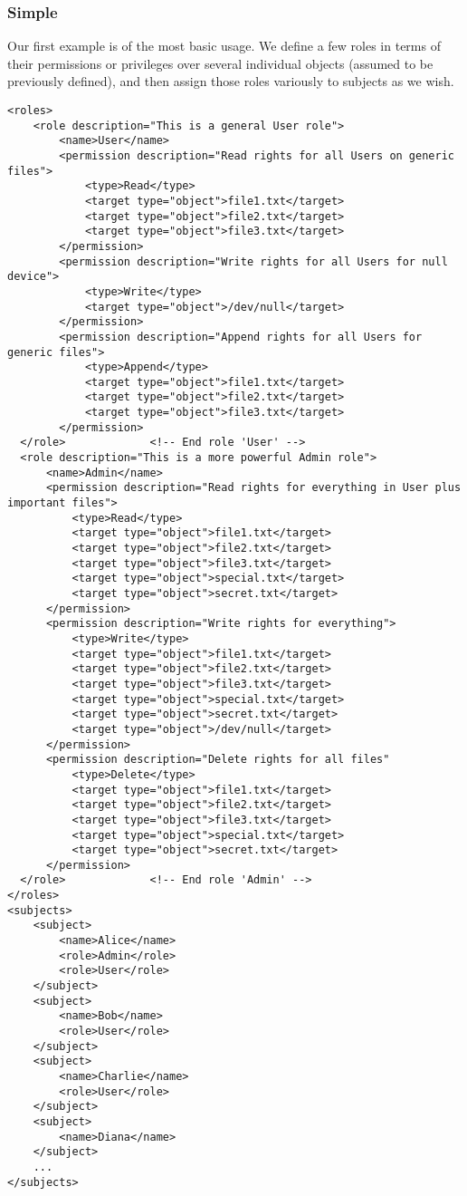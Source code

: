 \documentclass{article}
\begin{document}
\subsubsection{Simple}
Our first example is of the most basic usage. We define a few roles in terms of their permissions or privileges over several individual objects (assumed to be previously defined), and then assign those roles variously to subjects as we wish.
\begin{lstlisting}
<roles>
    <role description="This is a general User role">
        <name>User</name>
        <permission description="Read rights for all Users on generic files">
            <type>Read</type>
            <target type="object">file1.txt</target>
            <target type="object">file2.txt</target>
            <target type="object">file3.txt</target>
        </permission>
        <permission description="Write rights for all Users for null device">
            <type>Write</type>
            <target type="object">/dev/null</target>
        </permission>
        <permission description="Append rights for all Users for generic files">
            <type>Append</type>
            <target type="object">file1.txt</target>
            <target type="object">file2.txt</target>
            <target type="object">file3.txt</target>
        </permission>
  </role>             <!-- End role 'User' -->
  <role description="This is a more powerful Admin role">
      <name>Admin</name>
      <permission description="Read rights for everything in User plus important files">
          <type>Read</type>
          <target type="object">file1.txt</target>
          <target type="object">file2.txt</target>
          <target type="object">file3.txt</target>
          <target type="object">special.txt</target>
          <target type="object">secret.txt</target>
      </permission>
      <permission description="Write rights for everything">
          <type>Write</type>
          <target type="object">file1.txt</target>
          <target type="object">file2.txt</target>
          <target type="object">file3.txt</target>
          <target type="object">special.txt</target>
          <target type="object">secret.txt</target>
          <target type="object">/dev/null</target>
      </permission>
      <permission description="Delete rights for all files"
          <type>Delete</type>
          <target type="object">file1.txt</target>
          <target type="object">file2.txt</target>
          <target type="object">file3.txt</target>
          <target type="object">special.txt</target>
          <target type="object">secret.txt</target>
      </permission>
  </role>             <!-- End role 'Admin' -->
</roles>
<subjects>
    <subject>
        <name>Alice</name>
        <role>Admin</role>
        <role>User</role>
    </subject>
    <subject>
        <name>Bob</name>
        <role>User</role>
    </subject>
    <subject>
        <name>Charlie</name>
        <role>User</role>
    </subject>
    <subject>
        <name>Diana</name>
    </subject>
    ...
</subjects>
\end{lstlisting}
\end{document}
